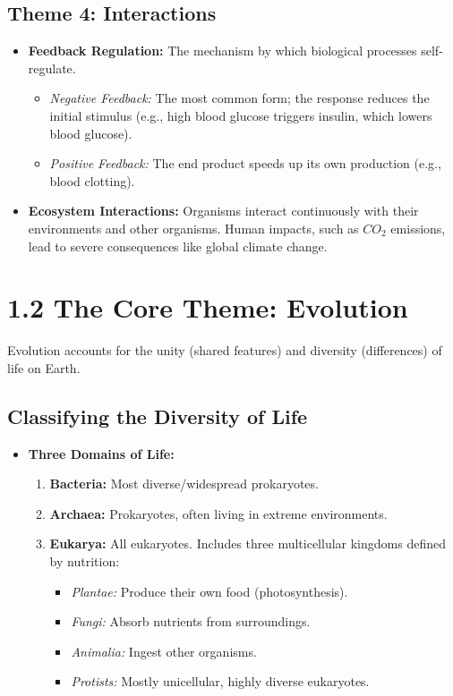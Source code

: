 \documentclass[11pt, a4paper]{article}
\begin{document}
\subsection*{Theme 4: Interactions}
\begin{itemize}
    \item \textbf{Feedback Regulation:} The mechanism by which biological processes self-regulate.
    \begin{itemize}
        \item \textit{Negative Feedback:} The most common form; the response reduces the initial stimulus (e.g., high blood glucose triggers insulin, which lowers blood glucose).
        \item \textit{Positive Feedback:} The end product speeds up its own production (e.g., blood clotting).
    \end{itemize}
    \item \textbf{Ecosystem Interactions:} Organisms interact continuously with their environments and other organisms. Human impacts, such as $CO_2$ emissions, lead to severe consequences like global climate change.
\end{itemize}

\section*{1.2 The Core Theme: Evolution}
Evolution accounts for the unity (shared features) and diversity (differences) of life on Earth.

\subsection*{Classifying the Diversity of Life}
\begin{itemize}
    \item \textbf{Three Domains of Life:}
    \begin{enumerate}
        \item \textbf{Bacteria:} Most diverse/widespread prokaryotes.
        \item \textbf{Archaea:} Prokaryotes, often living in extreme environments.
        \item \textbf{Eukarya:} All eukaryotes. Includes three multicellular kingdoms defined by nutrition:
        \begin{itemize}
            \item \textit{Plantae:} Produce their own food (photosynthesis).
            \item \textit{Fungi:} Absorb nutrients from surroundings.
            \item \textit{Animalia:} Ingest other organisms.
            \item \textit{Protists:} Mostly unicellular, highly diverse eukaryotes.
        \end{itemize}
    \end{enumerate}
\end{itemize}
\end{document}
